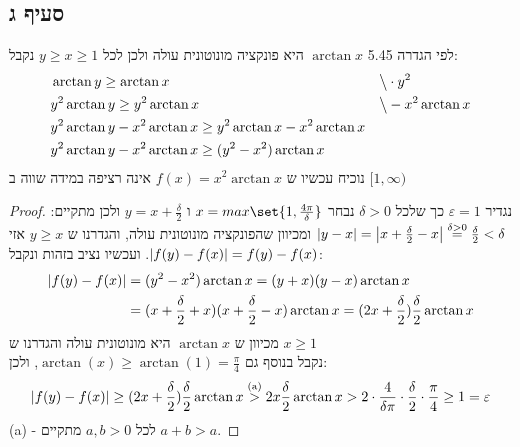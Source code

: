 \documentclass{article}
\DeclarePairedDelimiter\set\{\}
\begin{document}
	\subsection*{סעיף ג}
	לפי הגדרה 5.45 $\arctan x$ היא פונקציה מונוטונית עולה ולכן לכל $y \geq x \geq 1$ נקבל:
	\begin{align*}
		&\arctan y \geq \arctan x
		&&\big\backslash \cdot y^2 \\
		&y^2 \arctan y \geq y^2 \arctan x
		&&\big\backslash - x^2 \arctan x \\
		&y^2 \arctan y - x^2 \arctan x \geq y^2 \arctan x - x^2 \arctan x \\
		&y^2 \arctan y - x^2 \arctan x \geq (y^2 - x^2) \arctan x
	\end{align*}
	נוכיח עכשיו ש $f(x) = x^2 \arctan x$ אינה רציפה במידה שווה ב $[1, \infty)$
	\begin{proof}
		נגדיר $\varepsilon = 1$ כך שלכל $\delta > 0$
		נבחר $x = max\set{1, \frac{4\pi}{\delta}}$ ו $y=x + \frac{\delta}{2}$ ולכן מתקיים: $\left| y-x \right| = \left| x + \frac{\delta}{2} -x \right| \overset{\delta > 0}= \frac{\delta}{2} < \delta$
		ומכיוון שהפונקציה מונוטונית עולה, והגדרנו ש $y \geq x$ אזי $\left| f(y) - f(x) \right| = f(y) - f(x)$.
		ועכשיו נציב בזהות ונקבל:
		\begin{align*}
		\left| f(y) - f(x) \right| &=
		(y^2 - x^2) \arctan x =
		(y + x)(y - x) \arctan x \\
		&= (x + \frac{\delta}{2} + x)(x + \frac{\delta}{2} - x) \arctan x =
		(2x + \frac{\delta}{2})\frac{\delta}{2}\arctan x
	\end{align*}
	מכיוון ש $\arctan x$ היא מונוטונית עולה והגדרנו ש $x \geq 1$ \\
	נקבל בנוסף גם $\arctan(x) \geq \arctan(1) = \frac{\pi}{4}$, ולכן:
	\[
		\left| f(y) - f(x) \right| \geq
		(2x + \frac{\delta}{2})\frac{\delta}{2}\arctan x \overset{\text{(a)}}>
		2x\frac{\delta}{2}\arctan x >
		2 \cdot \frac{4}{\delta\pi} \cdot \frac{\delta}{2} \cdot \frac{\pi}{4} \geq 1 =
		\varepsilon
	\]
	(a) - לכל $a,b > 0$ מתקיים $a+b > a$.
	\end{proof}
\end{document}
